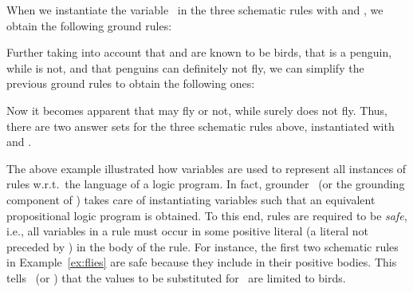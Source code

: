 \begin{example}
When we instantiate the variable~ in the three schematic rules
with  and ,
we obtain the following ground rules:
%

%
Further taking into account that  and  are known to
be birds, that  is a penguin, while  is not, and that
penguins can definitely not fly,
we can simplify the previous ground rules to obtain the following ones:%
%

%
Now it becomes apparent that 
may fly or not, while  surely does not fly.
Thus, there are two answer sets for the three schematic rules above,
instantiated with  and .%
\end{example}

The above example illustrated how variables are used to represent all instances of
rules w.r.t.\ the language of a logic program.
In fact, grounder \gringo\ (or the grounding component of \clingo)
takes care of instantiating variables
such that an equivalent propositional logic program is obtained.
To this end,
rules are required to be \emph{safe},
\label{pg:safe}%
%
i.e.,
all variables in a rule must occur in some positive literal
(a literal not preceded by ) in the body of the rule.
For instance, the first two schematic rules in Example~\ref{ex:flies}
are safe because they include  in their positive bodies.
This tells \gringo\ (or \clingo)
that the values to be substituted for~ are limited to birds.

